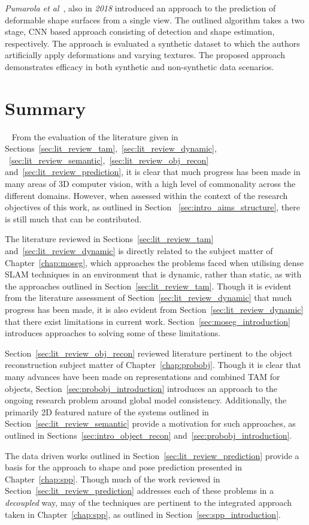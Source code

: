 \textit{Pumarola et al}~\cite{Pumarola2018}, also in \textit{2018} introduced an approach to the prediction 
of deformable shape surfaces from a single view. The outlined algorithm takes a two stage, CNN based approach 
consisting of detection and shape estimation, respectively. The approach is evaluated a synthetic dataset to 
which the authors artificially apply deformations and varying textures. The proposed approach demonstrates 
efficacy in both synthetic and non-synthetic data scenarios.

\section{Summary}
~\label{sec:lit_review_summary}
From the evaluation of the literature given in Sections~\ref{sec:lit_review_tam},~\ref{sec:lit_review_dynamic},
~\ref{sec:lit_review_semantic},~\ref{sec:lit_review_obj_recon} and~\ref{sec:lit_review_prediction}, it is clear 
that much progress has been made in many areas of 3D computer vision, with a high level of commonality across the different 
domains. However, when assessed within the context of the research objectives of this work, as outlined in Section
~\ref{sec:intro_aims_structure}, there is still much that can be contributed.

The literature reviewed in Sections~\ref{sec:lit_review_tam} and~\ref{sec:lit_review_dynamic} is directly related to 
the subject matter of Chapter~\ref{chap:moseg}, which approaches the problems faced when utilising dense SLAM techniques 
in an environment that is dynamic, rather than static, as with the approaches outlined in Section~\ref{sec:lit_review_tam}.
Though it is evident from the literature assessment of Section~\ref{sec:lit_review_dynamic} that much progress has been made, 
it is also evident from Section~\ref{sec:lit_review_dynamic} that there exist limitations in current work. 
Section~\ref{sec:moseg_introduction} introduces approaches to solving some of these limitations.

Section~\ref{sec:lit_review_obj_recon} reviewed literature pertinent to the object reconstruction subject matter of 
Chapter~\ref{chap:probobj}. Though it is clear that many advances have been made on representations and combined TAM for 
objects, Section~\ref{sec:probobj_introduction} introduces an approach to the ongoing research problem around global model 
consistency. Additionally, the primarily 2D featured nature of the systems outlined in Section~\ref{sec:lit_review_semantic} 
provide a motivation for such approaches, as outlined in Sections~\ref{sec:intro_object_recon} and~\ref{sec:probobj_introduction}.

The data driven works outlined in Section~\ref{sec:lit_review_prediction} provide a basis for the approach to shape and pose 
prediction presented in Chapter~\ref{chap:spp}. Though much of the work reviewed in Section~\ref{sec:lit_review_prediction} 
addresses each of these problems in a \textit{decoupled} way, may of the techniques are pertinent to the integrated approach 
taken in Chapter~\ref{chap:spp}, as outlined in Section~\ref{sec:spp_introduction}.
